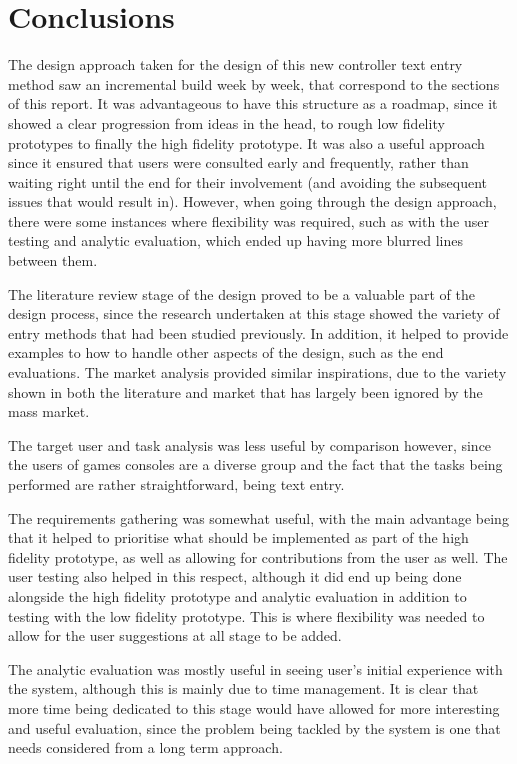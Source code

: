 \documentclass[conclusions.tex]{subfiles}
\begin{document}
\section{Conclusions} %
\label{sec:conclusions}
The design approach taken for the design of this new controller text entry
method saw an incremental build week by week, that correspond to the sections
of this report. It was advantageous to have this structure as a roadmap, since
it showed a clear progression from ideas in the head, to rough low fidelity
prototypes to finally the high fidelity prototype. It was also a useful
approach since it ensured that users were consulted early and frequently, rather
than waiting right until the end for their involvement (and avoiding the
subsequent issues that would result in). However, when going through the design
approach, there were some instances where flexibility was required, such as
with the user testing and analytic evaluation, which ended up having more
blurred lines between them.

The literature review stage of the design proved to be a valuable part of the
design process, since the research undertaken at this stage showed the variety
of entry methods that had been studied previously. In addition, it helped to
provide examples to how to handle other aspects of the design, such as the end
evaluations. The market analysis provided similar inspirations, due to the
variety shown in both the literature and market that has largely been ignored
by the mass market.

The target user and task analysis was less useful by comparison however, since
the users of games consoles are a diverse group and the fact that the tasks
being performed are rather straightforward, being text entry.

The requirements gathering was somewhat useful, with the main advantage being
that it helped to prioritise what should be implemented as part of the high
fidelity prototype, as well as allowing for contributions from the user as well.
The user testing also helped in this respect, although it did end up being done
alongside the high fidelity prototype and analytic evaluation in addition to
testing with the low fidelity prototype. This is where flexibility was needed to
allow for the user suggestions at all stage to be added.

The analytic evaluation was mostly useful in seeing user's initial experience
with the system, although this is mainly due to time management. It is clear
that more time being dedicated to this stage would have allowed for more
interesting and useful evaluation, since the problem being tackled by the
system is one that needs considered from a long term approach.
\end{document}
